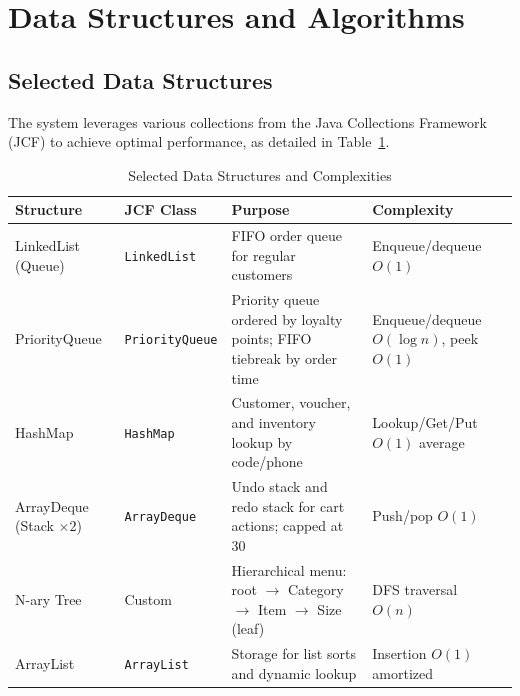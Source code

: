 \documentclass[11pt,a4paper]{article}
\begin{document}
\newpage

\section{Data Structures and Algorithms}

\subsection{Selected Data Structures}
The system leverages various collections from the Java Collections Framework (JCF) to achieve optimal performance, as detailed in Table~\ref{tab:data_structures}.

\begin{table}[H]
\centering
\caption{Selected Data Structures and Complexities}
\label{tab:data_structures}
\begin{tabular}{lllp{5.5cm}}
\toprule
\textbf{Structure} & \textbf{JCF Class} & \textbf{Purpose} & \textbf{Complexity} \\
\midrule
LinkedList (Queue) & \texttt{LinkedList} & FIFO order queue for regular customers & Enqueue/dequeue $O(1)$ \\
PriorityQueue & \texttt{PriorityQueue} & Priority queue ordered by loyalty points; FIFO tiebreak by order time & Enqueue/dequeue $O(\log n)$, peek $O(1)$ \\
HashMap & \texttt{HashMap} & Customer, voucher, and inventory lookup by code/phone & Lookup/Get/Put $O(1)$ average \\
ArrayDeque (Stack $\times 2$) & \texttt{ArrayDeque} & Undo stack and redo stack for cart actions; capped at 30 & Push/pop $O(1)$ \\
N-ary Tree & Custom & Hierarchical menu: root $\rightarrow$ Category $\rightarrow$ Item $\rightarrow$ Size (leaf) & DFS traversal $O(n)$ \\
ArrayList & \texttt{ArrayList} & Storage for list sorts and dynamic lookup & Insertion $O(1)$ amortized \\
\bottomrule
\end{tabular}
\end{table}
\end{document}
